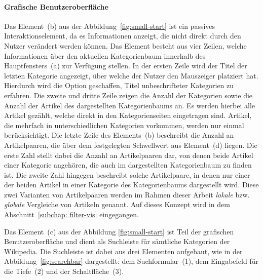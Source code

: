 \paragraph{Grafische Benutzeroberfläche}
Das Element~(b) aus der Abbildung~\ref{fig:small-start} ist ein passives Interaktionselement, da es Informationen anzeigt, die nicht direkt durch den Nutzer verändert werden können.
Das Element besteht aus vier Zeilen, welche Informationen über den aktuellen Kategorienbaum innerhalb des Hauptfensters~(a) zur Verfügung stellen.
In der ersten Zeile wird der Titel der letzten Kategorie angezeigt, über welche der Nutzer den Mauszeiger platziert hat.
Hierdurch wird die Option geschaffen, Titel unbeschrifteter Kategorien zu erfahren.
Die zweite und dritte Zeile zeigen die Anzahl der Kategorien sowie die Anzahl der Artikel des dargestellten Kategorienbaums an.
Es werden hierbei alle Artikel gezählt, welche direkt in den Kategorienseiten eingetragen sind. Artikel, die mehrfach in unterschiedlichen Kategorien vorkommen, werden nur einmal berücksichtigt.
Die letzte Zeile des Elements~(b) beschreibt die Anzahl an Artikelpaaren, die über dem festgelegten Schwellwert aus Element~(d) liegen.
Die erste Zahl stellt dabei die Anzahl an Artikelpaaren dar, von denen beide Artikel einer Kategorie angehören, die auch im dargestellten Kategorienbaum zu finden ist.
Die zweite Zahl hingegen beschreibt solche Artikelpaare, in denen nur einer der beiden Artikel in einer Kategorie des Kategorienbaums dargestellt wird.
Diese zwei Varianten von Artikelpaaren werden im Rahmen dieser Arbeit \emph{lokale} bzw. \emph{globale} Vergleiche von Artikeln genannt.
Auf dieses Konzept wird in dem Abschnitt~\ref{subchap: filter-vis} eingegangen.

Das Element~(c) aus der Abbildung \ref{fig:small-start} ist Teil der grafischen Benutzeroberfläche und dient als Suchleiste für sämtliche Kategorien der Wikipedia.
Die Suchleiste ist dabei aus drei Elementen aufgebaut, wie in der Abbildung~\ref{fig:searchbar} dargestellt: dem Suchformular~(1), dem Eingabefeld für die Tiefe~(2) und der Schaltfläche~(3).

